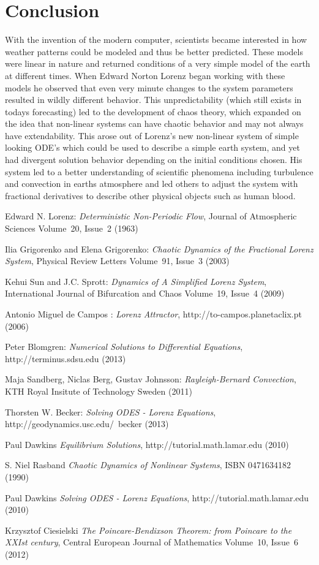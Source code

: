 \documentclass[letterpaper,titlepage,10pt]{article}
\begin{document}
\section{Conclusion}
With the invention of the modern computer, scientists became interested in how weather patterns could be modeled and thus be better predicted. These  models were linear in nature and returned conditions of a very simple model of the earth at different times.  When Edward Norton Lorenz began working with these models he observed that even very minute changes to the system parameters resulted in wildly different behavior. This unpredictability (which still exists in todays forecasting) led to the development of chaos theory, which expanded on the idea that non-linear systems can have chaotic behavior and may not always have extendability.  This arose out of Lorenz's new non-linear system of simple looking ODE's which could be used to describe a simple earth system, and yet had divergent solution behavior depending on the initial conditions chosen. His system led to a better understanding of scientific phenomena including turbulence and convection in earths atmosphere and led others to adjust the system with fractional derivatives to describe other physical objects such as human blood.

\begin{thebibliography}{99}
 Edward N. Lorenz:
\emph{Deterministic Non-Periodic Flow},
Journal of Atmospheric Sciences Volume~20, Issue~2 (1963)

 Ilia Grigorenko and Elena Grigorenko:
\emph{Chaotic Dynamics of the Fractional Lorenz System},
Physical Review Letters Volume~91, Issue~3 (2003)

 Kehui Sun and J.C. Sprott:
\emph{Dynamics of A Simplified Lorenz System},
International Journal of Bifurcation and Chaos Volume~19, Issue~4 (2009)

 Antonio Miguel de Campos :
\emph{Lorenz Attractor},
http://to-campos.planetaclix.pt (2006)

 Peter Blomgren:
\emph{Numerical Solutions to Differential Equations},
http://terminus.sdsu.edu (2013)

 Maja Sandberg, Niclas Berg, Gustav Johnsson:
\emph{Rayleigh-Bernard Convection},
KTH Royal Insitute of Technology Sweden (2011)

 Thorsten W. Becker:
\emph{Solving ODES - Lorenz Equations},
http://geodynamics.usc.edu/~becker (2013)

 Paul Dawkins
\emph{Equilibrium Solutions},
http://tutorial.math.lamar.edu (2010)


 S. Niel Rasband
\emph{Chaotic Dynamics of Nonlinear Systems},
ISBN 0471634182 (1990)

 Paul Dawkins
\emph{Solving ODES - Lorenz Equations},
http://tutorial.math.lamar.edu (2010)

 Krzysztof Ciesielski
\emph{The Poincare-Bendixson Theorem: from Poincare to the XXIst century},
Central European Journal of Mathematics Volume~10, Issue~6 (2012)

\end{thebibliography}
\end{document}
